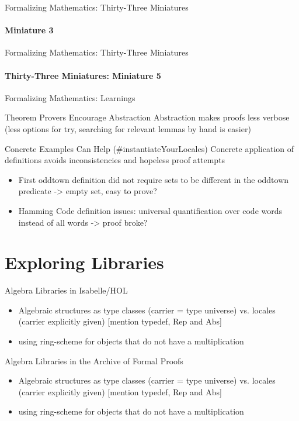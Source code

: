 \documentclass[en,navbaroff]{afvbeamer}
\begin{document}
	\begin{frame}{Formalizing Mathematics: Thirty-Three Miniatures}
		\framesubtitle{Miniature 3}
	\end{frame}
	
	\begin{frame}{Formalizing Mathematics: Thirty-Three Miniatures}
		\framesubtitle{Thirty-Three Miniatures: Miniature 5}
	\end{frame}
	
	\begin{frame}{Formalizing Mathematics: Learnings}
		\begin{orangeblock}{Theorem Provers Encourage Abstraction}
			Abstraction makes proofs less verbose (less options for try, searching for relevant lemmas by hand is easier)
		\end{orangeblock}
		
		\begin{orangeblock}{Concrete Examples Can Help ($\#$instantiateYourLocales)}
			Concrete application of definitions avoids inconsistencies and hopeless proof attempts
			\begin{itemize}
				\item First oddtown definition did not require sets to be different in the oddtown predicate -> empty set, easy to prove?
				\item Hamming Code definition issues: universal quantification over code words instead of all words -> proof broke?
			\end{itemize}
		\end{orangeblock}
	\end{frame}

	
	\section{Exploring Libraries}
	
	\begin{frame}{Algebra Libraries in Isabelle/HOL}
		\begin{itemize}
			\item Algebraic structures as type classes (carrier = type universe) vs. locales (carrier explicitly given) [mention typedef, Rep and Abs]
			\item using ring-scheme for objects that do not have a multiplication
		\end{itemize}
	\end{frame}
	
	\begin{frame}{Algebra Libraries in the Archive of Formal Proofs}
		\begin{itemize}
			\item Algebraic structures as type classes (carrier = type universe) vs. locales (carrier explicitly given) [mention typedef, Rep and Abs]
			\item using ring-scheme for objects that do not have a multiplication
		\end{itemize}
	\end{frame}
\end{document}
